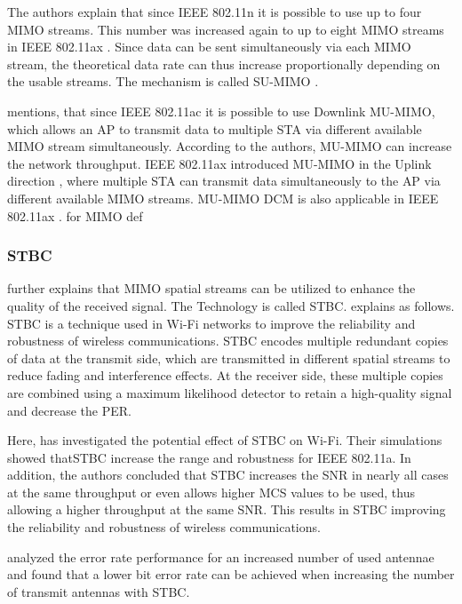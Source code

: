 The authors explain that since IEEE 802.11n it is possible to use up to four MIMO streams. This number was increased again to
up to eight MIMO streams in IEEE 802.11ax \cite{noauthor_ieee_2021}. Since data can be sent simultaneously via each MIMO stream,
the theoretical data rate can thus increase proportionally depending on the usable streams. The mechanism is called \ac{SU}-\ac{MIMO} \cite{noauthor_ieee_2021}.

\textcite{sauter_wireless_2022} mentions, that since IEEE 802.11ac it is possible to use Downlink \ac{MU}-\ac{MIMO}, which allows an \ac{AP} to transmit data to multiple \ac{STA} via different available \ac{MIMO} stream simultaneously.
According to the authors, \ac{MU}-\ac{MIMO} can increase the network throughput.
IEEE 802.11ax introduced \ac{MU}-\ac{MIMO} in the Uplink direction \cite{noauthor_ieee_2021}, where multiple \ac{STA} can transmit data simultaneously to the \ac{AP} via different available \ac{MIMO} streams.
MU-\ac{MIMO} DCM  is also applicable in IEEE 802.11ax \cite{noauthor_ieee_2021}.
\cite{omar_survey_2016} for MIMO def

\subsubsection*{\acf{STBC}}
\textcite{abbas_efficient_2016} further explains that \ac{MIMO} spatial streams can be utilized to enhance the quality of the received signal.
The Technology is called \ac{STBC}.
\textcite{santumon_space-time_2012} explains as follows. \ac{STBC} is a technique used in Wi-Fi networks to improve the reliability and robustness of wireless communications.
\ac{STBC} encodes multiple redundant copies of data at the transmit side, which are transmitted in different spatial streams to
reduce fading and interference effects. At the receiver side, these multiple copies are combined using a maximum likelihood detector
to retain a high-quality signal and decrease the \ac{PER}.


Here, \textcite{stamoulis_impact_2003} has investigated the potential effect of \ac{STBC} on Wi-Fi.
Their simulations showed that\ac{STBC} increase the range and robustness for IEEE 802.11a.
In addition, the authors concluded that \ac{STBC} increases the \ac{SNR} in nearly all cases at the same throughput or
even allows higher \ac{MCS} values to be used,
thus allowing a higher throughput at the same \ac{SNR}. This results in \ac{STBC} improving the reliability and robustness of wireless communications.

\textcite{ghosh_error_2014} analyzed the error rate performance for an increased number of used antennae and found
that a lower bit error rate can be achieved
when increasing the number of transmit antennas with \ac{STBC}.

